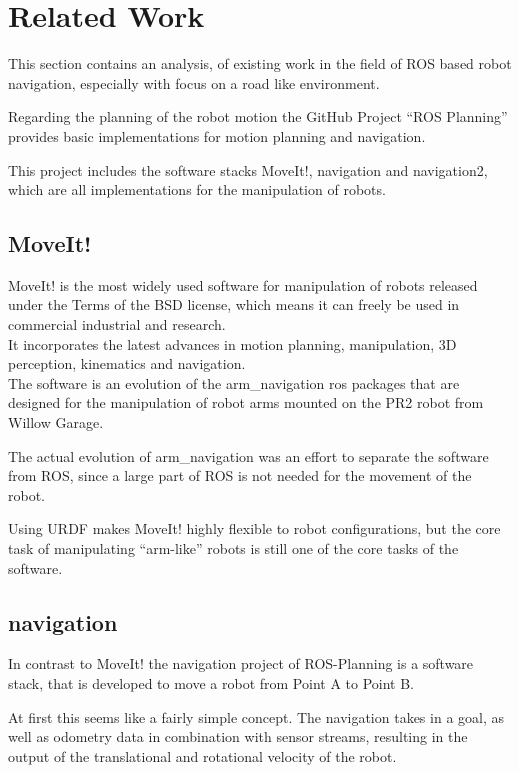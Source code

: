 \chapter{Related Work}
\label{relatedwork}

This section contains an analysis, of existing work in the field of ROS based robot navigation, especially with focus on a road like environment.

Regarding the planning of the robot motion the GitHub Project ``ROS Planning'' provides basic implementations for motion planning and navigation\cite{rosplanning}.

This project includes the software stacks MoveIt!, navigation and navigation2, which are all implementations for the manipulation of robots.\\
\section{MoveIt!}
MoveIt! is the most widely used software for manipulation of robots released under the Terms of the BSD license, which means it can freely be used in commercial industrial and research\cite{moveit}.\\
It incorporates the latest advances in motion planning, manipulation, 3D perception, kinematics and navigation.\\

The software is an evolution of the arm\_navigation ros packages that are designed for the manipulation of robot arms mounted on the PR2 robot from Willow Garage\cite{chitta2012moveit}\cite{willow}.

The actual evolution of arm\_navigation was an effort to separate the software from ROS, since a large part of ROS is not needed for the movement of the robot. 

Using URDF makes MoveIt! highly flexible to robot configurations, but the core task of manipulating ``arm-like'' robots is still one of the core tasks of the software.

\section{navigation}
In contrast to MoveIt! the navigation project of ROS-Planning is a software stack, that is developed to move a robot from Point A to Point B.

At first this seems like a fairly simple concept. The navigation takes in a goal, as well as odometry data in combination with sensor streams, resulting in the output of the translational and rotational velocity of the robot.

